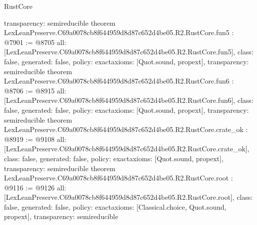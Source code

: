 \begin{lexlean}{RustCore}
\begin{coremodule}
{  transparency: semireducible
}
theorem LexLeanPreserve.C69a0078cb8f644959d8d87c652d4be05.R2.RustCore.fun5 : @7901 := @8705 {
  all: [LexLeanPreserve.C69a0078cb8f644959d8d87c652d4be05.R2.RustCore.fun5],
  class: false,
  generated: false,
  policy: exact{axioms: [Quot.sound, propext]},
  transparency: semireducible
}
theorem LexLeanPreserve.C69a0078cb8f644959d8d87c652d4be05.R2.RustCore.fun6 : @8706 := @8915 {
  all: [LexLeanPreserve.C69a0078cb8f644959d8d87c652d4be05.R2.RustCore.fun6],
  class: false,
  generated: false,
  policy: exact{axioms: [Quot.sound, propext]},
  transparency: semireducible
}
theorem LexLeanPreserve.C69a0078cb8f644959d8d87c652d4be05.R2.RustCore.crate_ok : @8919 := @9108 {
  all: [LexLeanPreserve.C69a0078cb8f644959d8d87c652d4be05.R2.RustCore.crate_ok],
  class: false,
  generated: false,
  policy: exact{axioms: [Quot.sound, propext]},
  transparency: semireducible
}
theorem LexLeanPreserve.C69a0078cb8f644959d8d87c652d4be05.R2.RustCore.root : @9116 := @9126 {
  all: [LexLeanPreserve.C69a0078cb8f644959d8d87c652d4be05.R2.RustCore.root],
  class: false,
  generated: false,
  policy: exact{axioms: [Classical.choice, Quot.sound, propext]},
  transparency: semireducible
}


\end{coremodule}
\end{lexlean}
